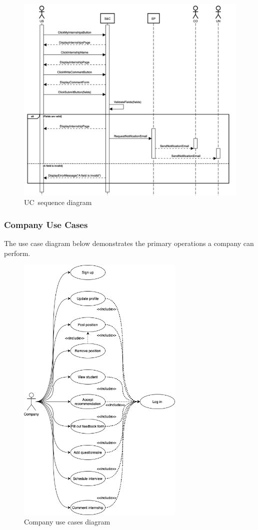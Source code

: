 \begin{figure}
    \centering
    \includegraphics[width=16cm]{images/sequence-diagrams/student-comments-internship.png}
    \caption{UC\theuc\ sequence diagram}
\end{figure}


\clearpage
\subsubsection{Company Use Cases}
The use case diagram below demonstrates the primary operations a company can perform.

\begin{figure}[h]
    \centering
    \includegraphics[width=8cm]{images/use-case-diagrams/company.png}
    \caption{Company use cases diagram}
\end{figure}

